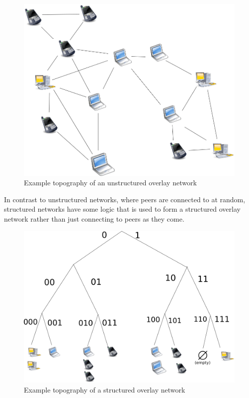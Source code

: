 \begin{figure}
	\includegraphics[width=\textwidth]{pictures/unstructured.png}
	\caption{Example topography of an unstructured overlay network}
	\label{Unstructured Overlay Network}
\end{figure}

In contrast to unstructured networks, where peers are connected to at random, structured networks have some logic that is used to form a structured overlay network rather than just connecting to peers as they come.

\begin{figure}
	\includegraphics[width=\textwidth]{pictures/structured.png}
	\caption{Example topography of a structured overlay network}
	\label{Structured Overlay Network}
\end{figure}

